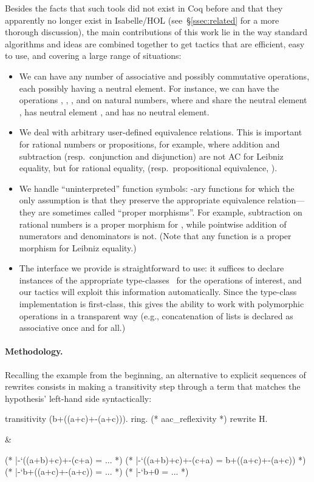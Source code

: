 \documentclass{llncs}
\begin{document}
Besides the facts that such tools did not exist in Coq before and that
they apparently no longer exist in Isabelle/HOL
(see~\S\ref{ssec:related} for a more thorough discussion), the main
contributions of this work lie in the way standard algorithms and
ideas are combined together to get tactics that are efficient, easy to
use, and covering a large range of situations:
\begin{itemize}
\item We can have any number of associative and possibly commutative
  operations, each possibly having a neutral element. For instance, we
  can have the operations , , \code{+}, and
  \code{*} on natural numbers, where  and \code{+} share the
  neutral element , \code{*} has neutral element , and
   has no neutral element.
\item We deal with arbitrary user-defined equivalence relations. This
  is important for rational numbers or propositions, for example,
  where addition and subtraction (resp.\ conjunction and disjunction)
  are not AC for Leibniz equality, but for rational equality,
   (resp.\ propositional equivalence, ).
\item We handle ``uninterpreted'' function symbols: -ary functions
  for which the only assumption is that they preserve the appropriate
  equivalence relation---they are sometimes called ``proper
  morphisms''.  For example, subtraction on rational numbers is a
  proper morphism for , while pointwise addition of
  numerators and denominators is not. (Note that any function is a
  proper morphism for Leibniz equality.)
\item The interface we provide is straightforward to use: it suffices
  to declare instances of the appropriate
  type-classes~\cite{SozeauOury08} for the operations of interest, and
  our tactics will exploit this information automatically.  Since the
  type-class implementation is first-class, this gives the ability to
  work with polymorphic operations in a transparent way (e.g.,
  concatenation of lists is declared as associative once and for all.)
\end{itemize}


\paragraph{Methodology.} 

Recalling the example from the beginning, an alternative to explicit
sequences of rewrites consists in making a transitivity step through a
term that matches the hypothesis' left-hand side syntactically:
\begin{twolistings}
\begin{coq}
transitivity (b+((a+c)+-(a+c))).
  ring. (* aac_reflexivity *)
rewrite H.
\end{coq}
&
\begin{coq}
(* |-`((a+b)+c)+-(c+a) = ... *)
(* \tab|-`((a+b)+c)+-(c+a) = b+((a+c)+-(a+c)) *)
(* |-`b+((a+c)+-(a+c)) = ... *)
(* |-`b+0 = ... *)
\end{coq}
\end{twolistings}
\end{document}
